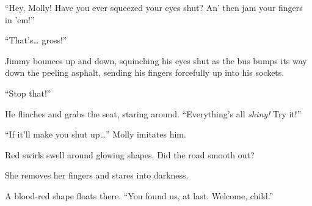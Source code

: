 
``Hey, Molly! Have you ever squeezed your eyes shut? An' then jam your
fingers in 'em!''

``That's\ldots{} gross!''

Jimmy bounces up and down, squinching his eyes shut as the bus bumps its
way down the peeling asphalt, sending his fingers forcefully up into his
sockets.

``Stop that!''

He flinches and grabs the seat, staring around. ``Everything's all
\emph{shiny!} Try it!''

``If it'll make you shut up\ldots{}'' Molly imitates him.

Red swirls swell around glowing shapes. Did the road smooth out?

She removes her fingers and stares into darkness.

A blood-red shape floats there. ``You found us, at last. Welcome,
child.''
